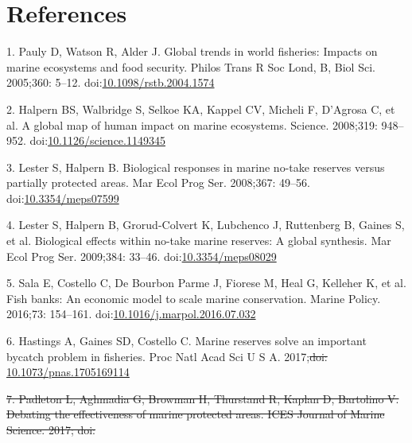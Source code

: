 \documentclass[12pt,]{article}
\providecommand{\DIFaddtex}[1]{{\protect\color{blue}\uwave{#1}}} %
\providecommand{\DIFdeltex}[1]{{\protect\color{red}\sout{#1}}}                      %
\providecommand{\DIFaddbegin}{} %
\providecommand{\DIFaddend}{} %
\providecommand{\DIFdelbegin}{} %
\providecommand{\DIFdelend}{} %
\providecommand{\DIFadd}[1]{\texorpdfstring{\DIFaddtex{#1}}{#1}} %
\providecommand{\DIFdel}[1]{\texorpdfstring{\DIFdeltex{#1}}{}} %
\newcommand{\DIFscaledelfig}{0.5}
\newlength{\DIFdelgraphicswidth} %
\newlength{\DIFdelgraphicsheight} %
\newcommand{\DIFaddincludegraphics}[2][]{{\color{blue}\fbox{\DIFOincludegraphics[#1]{#2}}}} %
\newcommand{\DIFdelincludegraphics}[2][]{%
\sbox{\DIFdelgraphicsbox}{\DIFOincludegraphics[#1]{#2}}%
\settoboxwidth{\DIFdelgraphicswidth}{\DIFdelgraphicsbox} %
\settoboxtotalheight{\DIFdelgraphicsheight}{\DIFdelgraphicsbox} %
\scalebox{\DIFscaledelfig}{%
\parbox[b]{\DIFdelgraphicswidth}{\usebox{\DIFdelgraphicsbox}\\[-\baselineskip] \rule{\DIFdelgraphicswidth}{0em}}\llap{\resizebox{\DIFdelgraphicswidth}{\DIFdelgraphicsheight}{%
\setlength{\unitlength}{\DIFdelgraphicswidth}%
\begin{picture}(1,1)%
\thicklines\linethickness{2pt} %
{\color[rgb]{1,0,0}\put(0,0){\framebox(1,1){}}}%
{\color[rgb]{1,0,0}\put(0,0){\line( 1,1){1}}}%
{\color[rgb]{1,0,0}\put(0,1){\line(1,-1){1}}}%
\end{picture}%
}\hspace*{3pt}}} %
} %
\DeclareRobustCommand{\DIFaddbegin}{\DIFOaddbegin \let\includegraphics\DIFaddincludegraphics} %
\DeclareRobustCommand{\DIFaddend}{\DIFOaddend \let\includegraphics\DIFOincludegraphics} %
\DeclareRobustCommand{\DIFdelbegin}{\DIFOdelbegin \let\includegraphics\DIFdelincludegraphics} %
\DeclareRobustCommand{\DIFdelend}{\DIFOaddend \let\includegraphics\DIFOincludegraphics} %
\begin{document}
\clearpage

\section{References}\label{references}

\hypertarget{refs}{}
\hypertarget{ref-pauly_2005-qV}{}
1. Pauly D, Watson R, Alder J. Global trends in world fisheries: Impacts
on marine ecosystems and food security. Philos Trans R Soc Lond, B, Biol
Sci. 2005;360: 5--12.
doi:\href{https://doi.org/10.1098/rstb.2004.1574}{10.1098/rstb.2004.1574}

\hypertarget{ref-halpern_2008-dK}{}
2. Halpern BS, Walbridge S, Selkoe KA, Kappel CV, Micheli F, D'Agrosa C,
et al. A global map of human impact on marine ecosystems. Science.
2008;319: 948--952.
doi:\href{https://doi.org/10.1126/science.1149345}{10.1126/science.1149345}

\hypertarget{ref-lester_2008-F_}{}
3. Lester S, Halpern B. Biological responses in marine no-take reserves
versus partially protected areas. Mar Ecol Prog Ser. 2008;367: 49--56.
doi:\href{https://doi.org/10.3354/meps07599}{10.3354/meps07599}

\hypertarget{ref-lester_2009-Ks}{}
4. Lester S, Halpern B, Grorud-Colvert K, Lubchenco J, Ruttenberg B,
Gaines S, et al. Biological effects within no-take marine reserves: A
global synthesis. Mar Ecol Prog Ser. 2009;384: 33--46.
doi:\href{https://doi.org/10.3354/meps08029}{10.3354/meps08029}

\hypertarget{ref-sala_2016-PV}{}
5. Sala E, Costello C, De Bourbon Parme J, Fiorese M, Heal G, Kelleher
K, et al. Fish banks: An economic model to scale marine conservation.
Marine Policy. 2016;73: 154--161.
doi:\href{https://doi.org/10.1016/j.marpol.2016.07.032}{10.1016/j.marpol.2016.07.032}

\hypertarget{ref-hastings_2017-sm}{}
6. Hastings A, Gaines SD, Costello C. Marine reserves solve an important
bycatch problem in fisheries. Proc Natl Acad Sci U S A. 2017;\DIFdelbegin \DIFdel{doi:
}\DIFdelend \DIFaddbegin \DIFadd{114:
8927--8934.
doi:}\DIFaddend \href{https://doi.org/10.1073/pnas.1705169114}{10.1073/pnas.1705169114}

\DIFdelbegin %
\DIFdel{7. Padleton L, Aghmadia G, Browman H, Thurstand R, Kaplan D, Bartolino
V.
Debating the effectiveness of marine protected areas. ICES Journal of
Marine Science. 2017;
doi:}%
\end{document}
